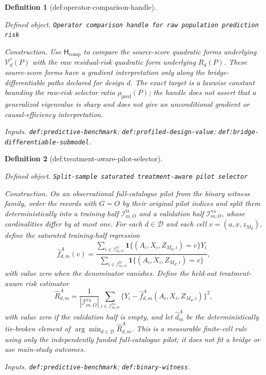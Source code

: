 \documentclass{article}
\newtheorem{definition}{Definition}
\begin{document}
\begin{definition}[def:operator-comparison-handle]\label{def:operator-comparison-handle}
\par\smallskip\noindent\emph{Defined object.} \texttt{Operator comparison handle for raw population prediction risk}
\par\smallskip\noindent\emph{Construction.} Use \(\mathsf H_{\mathrm{comp}}\) to compare the source-score quadratic forms underlying \(\mathcal V_d^*(P)\) with the raw residual-risk quadratic form underlying \(R_d(P)\). These source-score forms have a gradient interpretation only along the bridge-differentiable paths declared for design \(d\). The exact target is a lawwise constant bounding the raw-risk selector ratio \(\rho_{\mathrm{pred}}(P)\); the handle does not assert that a generalized eigenvalue is sharp and does not give an unconditional gradient or causal-efficiency interpretation.
\par\smallskip\noindent\emph{Inputs.} \texttt{def:\allowbreak{}predictive-\allowbreak{}benchmark}; \texttt{def:\allowbreak{}profiled-\allowbreak{}design-\allowbreak{}value}; \texttt{def:\allowbreak{}bridge-\allowbreak{}differentiable-\allowbreak{}submodel}.
\end{definition}

\begin{definition}[def:treatment-aware-pilot-selector]\label{def:treatment-aware-pilot-selector}
\par\smallskip\noindent\emph{Defined object.} \texttt{Split-\allowbreak{}sample saturated treatment-\allowbreak{}aware pilot selector}
\par\smallskip\noindent\emph{Construction.} On an observational full-catalogue pilot from the binary witness family, order the records with \(G=O\) by their original pilot indices and split them deterministically into a training half \(\mathcal I_{m,O}^{\mathrm{tr}}\) and a validation half \(\mathcal I_{m,O}^{\mathrm{va}}\), whose cardinalities differ by at most one. For each \(d\in\mathcal D\) and each cell \(v=(a,x,z_{M_d})\), define the saturated training-half regression
\[
 \widehat f_{d,m}^A(v)=
 \frac{\sum_{i\in\mathcal I_{m,O}^{\mathrm{tr}}}
 \mathbf 1\{(A_i,X_i,Z_{M_d,i})=v\}Y_i}
 {\sum_{i\in\mathcal I_{m,O}^{\mathrm{tr}}}
 \mathbf 1\{(A_i,X_i,Z_{M_d,i})=v\}},
\]
with value zero when the denominator vanishes. Define the held-out treatment-aware risk estimator
\[
 \widehat R_{d,m}^A=
 \frac{1}{|\mathcal I_{m,O}^{\mathrm{va}}|}
 \sum_{i\in\mathcal I_{m,O}^{\mathrm{va}}}
 \{Y_i-\widehat f_{d,m}^A(A_i,X_i,Z_{M_d,i})\}^2,
\]
with value zero if the validation half is empty, and let \(\widehat d_m^A\) be the deterministically tie-broken element of \(\arg\min_{d\in\mathcal D}\widehat R_{d,m}^A\). This is a measurable finite-cell rule using only the independently funded full-catalogue pilot; it does not fit a bridge or use main-study outcomes.
\par\smallskip\noindent\emph{Inputs.} \texttt{def:\allowbreak{}predictive-\allowbreak{}benchmark}; \texttt{def:\allowbreak{}binary-\allowbreak{}witness}.
\end{definition}
\end{document}
